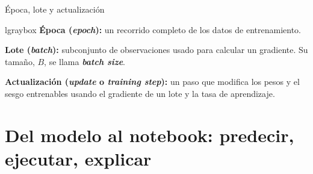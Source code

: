 \documentclass[10pt,aspectratio=169,xcolor={dvipsnames}]{beamer}
\newenvironment{caja}[1][lgraybox]{\begin{beamercolorbox}[sep=0.7em,wd=\linewidth]{#1}}{\end{beamercolorbox}}
\begin{document}
\begin{frame}{Época, lote y actualización}
    \begin{caja}
        \small
        \textbf{Época (\textit{epoch}):} un recorrido completo de los datos de entrenamiento.\par\smallskip
        \textbf{Lote (\textit{batch}):} subconjunto de observaciones usado para calcular un gradiente.
        Su tamaño, $B$, se llama \textbf{\textit{batch size}}.\par\smallskip
        \textbf{Actualización (\textit{update} o \textit{training step}):} un paso que modifica los pesos y el sesgo entrenables usando el gradiente de un lote y la tasa de aprendizaje.
    \end{caja}
    \par\smallskip
    \centering
    \resizebox{\linewidth}{!}{}
\end{frame}

\section{Del modelo al notebook: predecir, ejecutar, explicar}
\end{document}
